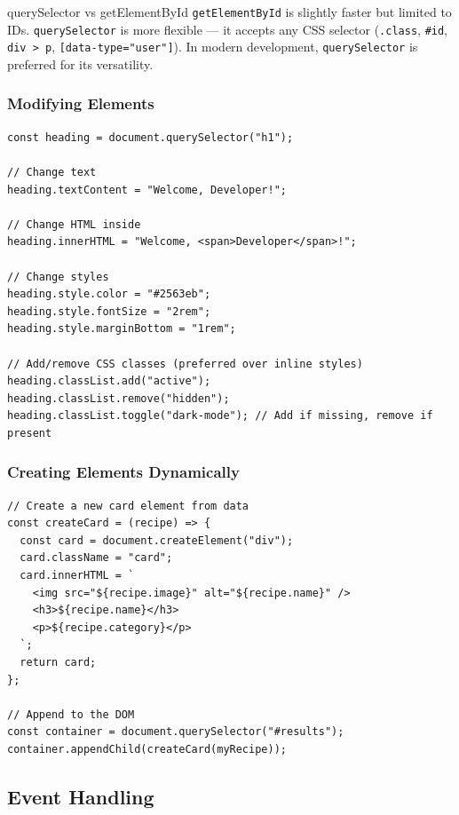 \documentclass[12pt]{article}
\begin{document}
\begin{conceptbox}{querySelector vs getElementById}
\texttt{getElementById} is slightly faster but limited to IDs. \texttt{querySelector} is more flexible --- it accepts any CSS selector (\texttt{.class}, \texttt{\#id}, \texttt{div > p}, \texttt{[data-type="user"]}). In modern development, \texttt{querySelector} is preferred for its versatility.
\end{conceptbox}

\subsubsection*{Modifying Elements}

\begin{lstlisting}
const heading = document.querySelector("h1");

// Change text
heading.textContent = "Welcome, Developer!";

// Change HTML inside
heading.innerHTML = "Welcome, <span>Developer</span>!";

// Change styles
heading.style.color = "#2563eb";
heading.style.fontSize = "2rem";
heading.style.marginBottom = "1rem";

// Add/remove CSS classes (preferred over inline styles)
heading.classList.add("active");
heading.classList.remove("hidden");
heading.classList.toggle("dark-mode"); // Add if missing, remove if present
\end{lstlisting}

\subsubsection*{Creating Elements Dynamically}

\begin{lstlisting}
// Create a new card element from data
const createCard = (recipe) => {
  const card = document.createElement("div");
  card.className = "card";
  card.innerHTML = `
    <img src="${recipe.image}" alt="${recipe.name}" />
    <h3>${recipe.name}</h3>
    <p>${recipe.category}</p>
  `;
  return card;
};

// Append to the DOM
const container = document.querySelector("#results");
container.appendChild(createCard(myRecipe));
\end{lstlisting}

\subsection{Event Handling}
\end{document}

